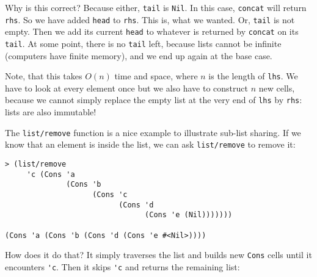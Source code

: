\documentclass{article}
\begin{document}
Why is this correct? Because either, \lstinline{tail} is \lstinline{Nil}. In this case, \lstinline{concat} will return \lstinline{rhs}. So we have added \lstinline{head} to \lstinline{rhs}. This is, what we wanted. Or, \lstinline{tail} is not empty. Then we add its current \lstinline{head} to whatever is returned by \lstinline{concat} on its \lstinline{tail}. At some point, there is no \lstinline{tail} left, because lists cannot be infinite (computers have finite memory), and we end up again at the base case.

Note, that this takes $O(n)$ time and space, where $n$ is the length of \lstinline{lhs}. We have to look at every element once but we also have to construct $n$ new cells, because we cannot simply replace the empty list at the very end of \lstinline{lhs} by \lstinline{rhs}: lists are also immutable!

The \lstinline{list/remove} function is a nice example to illustrate sub-list sharing. If we know that an element is inside the list, we can ask \lstinline{list/remove} to remove it:

\begin{lstlisting}
> (list/remove
     'c (Cons 'a
              (Cons 'b
                    (Cons 'c
                          (Cons 'd
                                (Cons 'e (Nil)))))))

(Cons 'a (Cons 'b (Cons 'd (Cons 'e #<Nil>))))
\end{lstlisting}

How does it do that? It simply traverses the list and builds new \lstinline{Cons} cells until it encounters \lstinline{'c}. Then it skips \lstinline{'c} and returns the remaining list:

\vspace{1cm}


\end{document}
